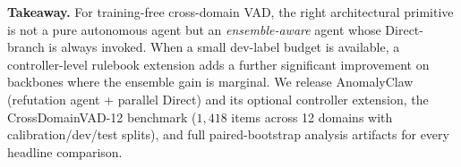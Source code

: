 \textbf{Takeaway.} For training-free cross-domain VAD, the right architectural primitive is not a pure autonomous agent but an \emph{ensemble-aware} agent whose Direct-branch is always invoked. When a small dev-label budget is available, a controller-level rulebook extension adds a further significant improvement on backbones where the ensemble gain is marginal. We release AnomalyClaw (refutation agent + parallel Direct) and its optional controller extension, the CrossDomainVAD-12 benchmark ($1{,}418$ items across 12 domains with calibration/dev/test splits), and full paired-bootstrap analysis artifacts for every headline comparison.
